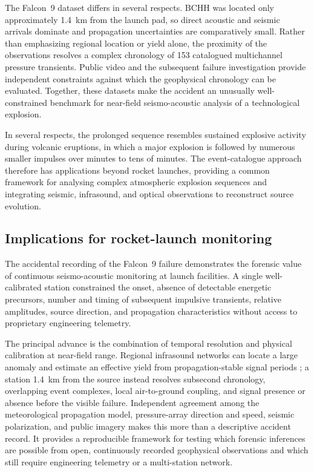 \documentclass[]{seismica}
\begin{document}
The Falcon~9 dataset differs in several respects. BCHH was located only
approximately 1.4~km from the launch pad, so direct acoustic and seismic
arrivals dominate and propagation uncertainties are comparatively small.
Rather than emphasizing regional location or yield alone, the proximity of the
observations resolves a complex chronology of 153 catalogued multichannel
pressure transients. Public video and the subsequent failure investigation
provide independent constraints against which the geophysical chronology can
be evaluated. Together, these datasets make the accident an unusually
well-constrained benchmark for near-field seismo-acoustic analysis of a
technological explosion.

In several respects, the prolonged sequence resembles sustained explosive activity during volcanic eruptions, in which a major explosion is followed by numerous smaller impulses over minutes to tens of minutes. The event-catalogue approach therefore has applications beyond rocket launches, providing a common framework for analysing complex atmospheric explosion sequences and integrating seismic, infrasound, and optical observations to reconstruct source evolution.

\subsection{Implications for rocket-launch monitoring}
\label{sec:discussion_monitoring}

The accidental recording of the Falcon~9 failure demonstrates the forensic
value of continuous seismo-acoustic monitoring at launch facilities. A single
well-calibrated station constrained the onset, absence of detectable energetic
precursors, number and timing of subsequent impulsive transients, relative
amplitudes, source direction, and propagation characteristics without access to
proprietary engineering telemetry.

The principal advance is the combination of temporal resolution and physical
calibration at near-field range. Regional infrasound networks can locate a
large anomaly and estimate an effective yield from propagation-stable signal
periods \citep{silber_scamfer_newglenn_2026}; a station 1.4~km from the source
instead resolves subsecond chronology, overlapping event complexes, local
air-to-ground coupling, and signal presence or absence before the visible
failure. Independent agreement among the meteorological propagation model,
pressure-array direction and speed, seismic polarization, and public imagery
makes this more than a descriptive accident record. It provides a reproducible
framework for testing which forensic inferences are possible from open,
continuously recorded geophysical observations and which still require
engineering telemetry or a multi-station network.
\end{document}
